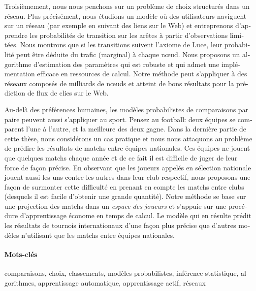 \begin{otherlanguage}{french}
Troisièmement, nous nous penchons sur un problème de choix structurés dans un réseau.
Plus précisément, nous étudions un modèle où des utilisateurs naviguent sur un réseau (par exemple en suivant des liens sur le Web) et entreprenons d'apprendre les probabilités de transition sur les arêtes à partir d'observations limitées.
Nous montrons que si les transitions suivent l'axiome de Luce, leur probabilité peut être déduite du trafic (marginal) à chaque nœud.
Nous proposons un algorithme d'estimation des paramètres qui est robuste et qui admet une implémentation efficace en ressources de calcul.
Notre méthode peut s'appliquer à des réseaux composés de milliards de nœuds et atteint de bons résultats pour la prédiction de flux de clics sur le Web.

Au-delà des préférences humaines, les modèles probabilistes de comparaisons par paire peuvent aussi s'appliquer au sport.
Pensez au football: deux équipes se comparent l'une à l'autre, et la meilleure des deux gagne.
Dans la dernière partie de cette thèse, nous considérons un cas pratique et nous nous attaquons au problème de prédire les résultats de matchs entre équipes nationales.
Ces équipes ne jouent que quelques matchs chaque année et de ce fait il est difficile de juger de leur force de façon précise.
En observant que les joueurs appelés en sélection nationale jouent aussi les uns contre les autres dans leur club respectif, nous proposons une façon de surmonter cette difficulté en prenant en compte les matchs entre clubs (desquels il est facile d'obtenir une grande quantité).
Notre méthode se base sur une projection des matchs dans un \emph{espace des joueurs} et s'appuie sur une procédure d'apprentissage économe en temps de calcul.
Le modèle qui en résulte prédit les résultats de tournois internationaux d'une façon plus précise que d'autres modèles n'utilisant que les matchs entre équipes nationales.

\paragraph{Mots-clés}
comparaisons, choix, classements, modèles probabilistes, inférence statistique, algorithmes, apprentissage automatique, apprentissage actif, réseaux
\end{otherlanguage}
